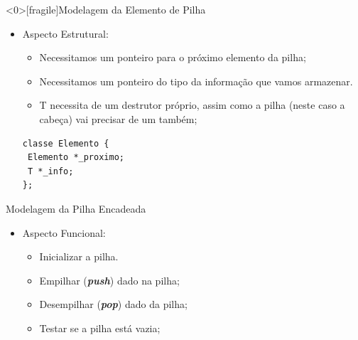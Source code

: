 \documentclass[12pt,table,xcolor={dvipsnames}]{beamer}
\begin{document}
\begin{frame}<0>[fragile]{Modelagem da Elemento de Pilha}

\begin{itemize}
\item Aspecto Estrutural:
\begin{itemize}
\item Necessitamos um ponteiro para o próximo elemento da pilha;
\item Necessitamos um ponteiro do tipo da informação que vamos armazenar.
\item T necessita de um destrutor próprio, assim como a pilha (neste caso a cabeça) vai precisar de um também;
\end{itemize}
\begin{lstlisting}
classe Elemento {
 Elemento *_proximo;
 T *_info;
};
\end{lstlisting}
\end{itemize}
\end{frame}

\begin{frame}[fragile]{Modelagem da Pilha Encadeada}

\begin{itemize}
\item Aspecto Funcional:
\begin{itemize}
\item Inicializar a pilha.
\item Empilhar (\textit{\textbf{push}}) dado na pilha;
\item Desempilhar (\textit{\textbf{pop}}) dado da pilha;
\item Testar se a pilha está vazia;

\end{itemize}
\end{itemize}
\end{frame}
\end{document}
